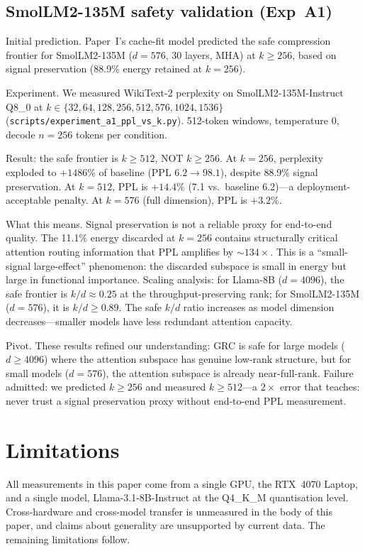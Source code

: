 \documentclass[11pt]{article}
\begin{document}
\subsection{SmolLM2-135M safety validation (Exp~A1)}
\label{sec:smollm2-a1}

Initial prediction. Paper~I's cache-fit model predicted the
safe compression frontier for SmolLM2-135M ($d{=}576$, 30 layers, MHA)
at $k{\ge}256$, based on signal preservation (88.9\% energy retained at
$k{=}256$).

Experiment. We measured WikiText-2 perplexity on
SmolLM2-135M-Instruct Q8\_0 at $k\in\{32,64,128,256,512,576,1024,1536\}$
(\texttt{scripts/experiment\_a1\_ppl\_vs\_k.py}).  512-token windows,
temperature 0, decode $n{=}256$ tokens per condition.

Result: the safe frontier is $k{\ge}512$, NOT $k{\ge}256$.
At $k{=}256$, perplexity exploded to $+1486\%$ of baseline
(PPL $6.2\to98.1$), despite 88.9\% signal preservation.  At $k{=}512$,
PPL is $+14.4\%$ (7.1 vs.\ baseline 6.2)---a deployment-acceptable
penalty.  At $k{=}576$ (full dimension), PPL is $+3.2\%$.

What this means.  Signal preservation is not a reliable
proxy for end-to-end quality.  The 11.1\% energy discarded at $k{=}256$
contains structurally critical attention routing information that PPL
amplifies by ${\sim}134\times$.  This is a ``small-signal large-effect''
phenomenon: the discarded subspace is small in energy but large in
functional importance.  Scaling analysis: for Llama-8B ($d{=}4096$),
the safe frontier is $k/d{\approx}0.25$ at the throughput-preserving
rank; for SmolLM2-135M ($d{=}576$), it is $k/d{\ge}0.89$.  The safe
$k/d$ ratio increases as model dimension decreases---smaller models have
less redundant attention capacity.

Pivot.  These results refined our understanding: GRC is safe for
large models ($d{\ge}4096$) where the attention subspace has genuine
low-rank structure, but for small models ($d{=}576$), the attention
subspace is already near-full-rank.  Failure admitted: we
predicted $k{\ge}256$ and measured $k{\ge}512$---a $2{\times}$ error that
teaches: never trust a signal preservation proxy without end-to-end
PPL measurement.

\section{Limitations}
\label{sec:limits}

All measurements in this paper come from a single GPU, the RTX~4070
Laptop, and a single model, Llama-3.1-8B-Instruct at the Q4\_K\_M
quantisation level. Cross-hardware and cross-model transfer is unmeasured
in the body of this paper, and claims about generality are unsupported by
current data. The remaining limitations follow.
\end{document}
